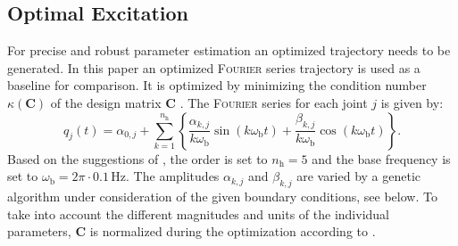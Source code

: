 \subsection{Optimal Excitation}
\label{subsec:OptimalExcitation}

For precise and robust parameter estimation an optimized trajectory needs to be generated. In this paper an optimized \textsc{Fourier} series trajectory is used as a baseline for comparison. It is optimized by minimizing the condition number $\kappa(\boldsymbol{C})$ of the design matrix $\boldsymbol{C}$ \cite{Bona.2005,Kostic.2004,Olsen.2002,Swevers.1997}.
The \textsc{Fourier} series for each joint $j$ is given by:
\begin{equation} 
\label{eq:fourier_series}
q_j(t) = \alpha_{0,j} + \sum \limits_{k=1}^{n_\mathrm{h}} \left\{ \frac{\alpha_{k,j}}{k \omega_\mathrm{b}} \sin(k \omega_\mathrm{b} t) + \frac{\beta_{k,j}}{k \omega_\mathrm{b}} \cos(k \omega_\mathrm{b} t) \right\}.
\end{equation}
Based on the suggestions of \cite{Swevers.1997,Bona.2005}, the order is set to $n_\mathrm{h}=5$ and the base frequency is set to $\omega_\mathrm{b}=2\pi \cdot 0.1\,\mathrm{Hz}$. The amplitudes $\alpha_{k,j}$ and $\beta_{k,j}$ are varied by a genetic algorithm under consideration of the given boundary conditions, see below.
To take into account the different magnitudes and units of the individual parameters, $\boldsymbol{C}$ is normalized during the optimization according to \cite{Sun.2008}.


